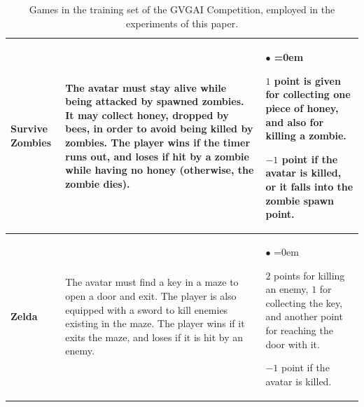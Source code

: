 \documentclass[conference]{IEEEtran}
\begin{document}
\begin{table}[!t]
\begin{center}
\begin{tabular}{|m{1.4cm}|m{8cm}|m{6cm}|}
\hline
\textbf{Survive Zombies} & The avatar must stay alive while being attacked by spawned zombies. It may collect honey, dropped by bees, in order to avoid being killed by zombies. The player wins if the timer runs out, and loses if hit by a zombie while having no honey (otherwise, the zombie dies).& \begin{list}{$\bullet$}{\leftmargin=2pt \itemindent=0em} \item $1$ point is given for collecting one piece of honey, and also for killing a zombie. \item $-1$ point if the avatar is killed, or it falls into the zombie spawn point. \end{list} \\
\hline
\textbf{Zelda} & The avatar must find a key in a maze to open a door and exit. The player is also equipped with a sword to kill enemies existing in the maze. The player wins if it exits the maze, and loses if it is hit by an enemy. & \begin{list}{$\bullet$}{\leftmargin=2pt \itemindent=0em} \item $2$ points for killing an enemy, $1$ for collecting the key, and another point for reaching the door with it. \item $-1$ point if the avatar is killed. \end{list} \\
\hline
\end{tabular}
\caption{Games in the training set of the GVGAI Competition, employed in the experiments of this paper.}
\label{tab:games}
\end{center}
\end{table}
\end{document}
